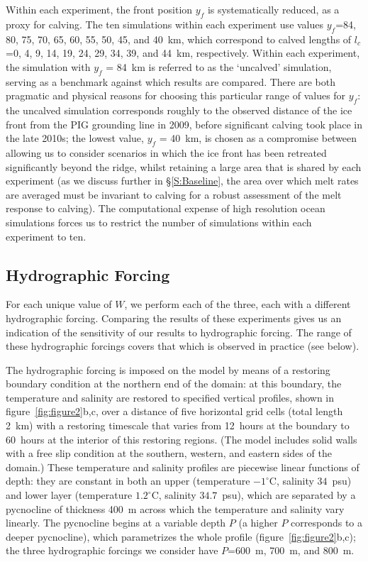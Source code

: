 \documentclass[draft]{agujournal2019}
\begin{document}
Within each experiment, the front position $y_f$ is systematically reduced, as a proxy for calving. The ten simulations within each experiment use values $y_f$=84, 80, 75, 70, 65, 60, 55, 50, 45, and 40~km, which correspond to calved lengths of $l_c$=0, 4, 9, 14, 19, 24, 29, 34, 39, and 44~km, respectively. Within each experiment, the simulation with $y_f$ = 84~km is referred to as the `uncalved' simulation, serving as a benchmark against which results are compared. There are both pragmatic and physical reasons for choosing this particular range of values for $y_f$: the uncalved simulation corresponds roughly to the observed distance of the ice front from the PIG grounding line in 2009, before significant calving took place in the late 2010s; the lowest value, $y_f$ = 40~km, is chosen as a compromise between allowing us to consider scenarios in which the ice front has been retreated significantly beyond the ridge, whilst retaining a large area that is shared by each experiment (as we discuss further in \S\ref{S:Baseline}, the area over which melt rates are averaged must be invariant to calving for a robust assessment of the melt response to calving). The computational expense of high resolution ocean simulations forces us to restrict the number of simulations within each experiment to ten.


\subsection{Hydrographic Forcing}\label{S:Experiment:Hydrography}
For each unique value of $W$, we perform each of the three, each with a different hydrographic forcing. Comparing the results of these experiments gives us an indication of the sensitivity of our results to hydrographic forcing. The range of these hydrographic forcings covers that which is observed in practice (see below).

The hydrographic forcing is imposed on the model by means of a restoring boundary condition at the northern end of the domain: at this boundary, the temperature and salinity are restored to specified vertical profiles, shown in figure~\ref{fig:figure2}b,c, over a distance of five horizontal grid cells (total length 2 km) with a restoring timescale that varies from 12~hours at the boundary to 60~hours at the interior of this restoring regions. (The model includes solid walls with a free slip condition at the southern, western, and eastern sides of the domain.) These temperature and salinity profiles are piecewise linear functions of depth: they are constant in both an upper (temperature $-1^\circ$C, salinity $34$~psu) and lower layer (temperature $1.2^\circ$C, salinity $34.7$~psu), which are separated by a pycnocline of thickness 400~m across which the temperature and salinity vary linearly. The pycnocline begins at a variable depth $P$ (a higher $P$ corresponds to a deeper pycnocline), which parametrizes the whole profile (figure~\ref{fig:figure2}b,c); the three hydrographic forcings we consider have $P$=600 m, 700 m, and 800 m. 
\end{document}

